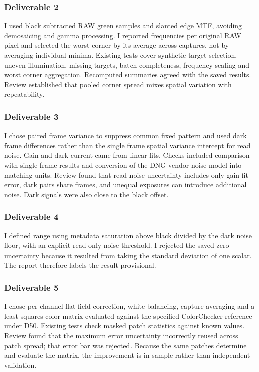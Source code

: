 \documentclass{article}
\begin{document}
\subsubsection*{Deliverable 2}
I used black subtracted RAW green samples and slanted edge MTF, avoiding demosaicing and gamma processing. 
I reported frequencies per original RAW pixel and selected the worst corner by its average across captures, 
not by averaging individual minima. Existing tests cover synthetic target selection, uneven illumination, missing targets, 
batch completeness, frequency scaling and worst corner aggregation. Recomputed summaries agreed with the saved results. 
Review established that pooled corner spread mixes spatial variation with repeatability.

\subsubsection*{Deliverable 3}
I chose paired frame variance to suppress common fixed pattern and used dark frame differences rather than the single frame 
spatial variance intercept for read noise. Gain and dark current came from linear fits. Checks included comparison with single 
frame results and conversion of the DNG vendor noise model into matching units. Review found that read noise uncertainty includes
 only gain fit error, dark pairs share frames, and unequal exposures can introduce additional noise. Dark signals were also 
 close to the black offset.

\subsubsection*{Deliverable 4}
I defined range using metadata saturation above black divided by the dark noise floor, with an explicit read only noise threshold. 
I rejected the saved zero uncertainty because it resulted from taking the standard deviation of one scalar. 
The report therefore labels the result provisional. 

\subsubsection*{Deliverable 5}
I chose per channel flat field correction, white balancing, capture averaging and a least squares color matrix evaluated 
against the specified ColorChecker reference under D50. Existing tests check masked patch statistics against known values.
Review found that the maximum error uncertainty incorrectly reused across patch spread; that error bar was rejected. 
Because the same patches determine and evaluate the matrix, the improvement is in sample rather than independent validation.
\end{document}
